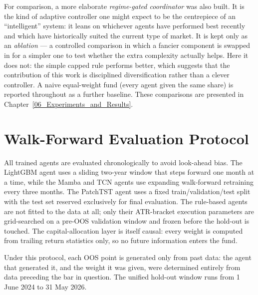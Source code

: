 For comparison, a more elaborate \textit{regime-gated coordinator} was also built. It is the kind of adaptive controller one might expect to be the centrepiece of an ``intelligent'' system: it leans on whichever agents have performed best recently and which have historically suited the current type of market. It is kept only as an \textit{ablation} --- a controlled comparison in which a fancier component is swapped in for a simpler one to test whether the extra complexity actually helps. Here it does not: the simple capped rule performs better, which suggests that the contribution of this work is disciplined diversification rather than a clever controller. A naive equal-weight fund (every agent given the same share) is reported throughout as a further baseline. These comparisons are presented in Chapter~\ref{06_Experiments_and_Results}.

\section{Walk-Forward Evaluation Protocol}
\label{sec:wfo_protocol}

All trained agents are evaluated chronologically to avoid look-ahead bias. The LightGBM agent uses a sliding two-year window that steps forward one month at a time, while the Mamba and TCN agents use expanding walk-forward retraining every three months. The PatchTST agent uses a fixed train/validation/test split with the test set reserved exclusively for final evaluation. The rule-based agents are not fitted to the data at all; only their ATR-bracket execution parameters are grid-searched on a pre-OOS validation window and frozen before the hold-out is touched. The capital-allocation layer is itself causal: every weight is computed from trailing return statistics only, so no future information enters the fund.


Under this protocol, each OOS point is generated only from past data: the agent that generated it, and the weight it was given, were determined entirely from data preceding the bar in question. The unified hold-out window runs from 1 June 2024 to 31 May 2026.
